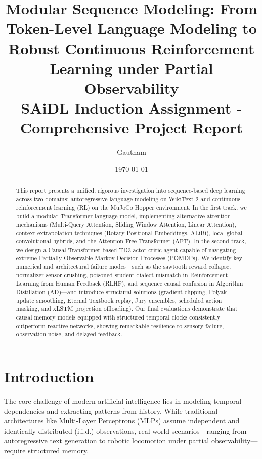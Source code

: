 \documentclass[11pt,a4paper]{article}
\title{\textbf{Modular Sequence Modeling: From Token-Level Language Modeling to Robust Continuous Reinforcement Learning under Partial Observability} \\ \large SAiDL Induction Assignment - Comprehensive Project Report}
\author{Gautham}
\date{\today}
\begin{document}
\maketitle

\begin{abstract}
This report presents a unified, rigorous investigation into sequence-based deep learning across two domains: autoregressive language modeling on WikiText-2 and continuous reinforcement learning (RL) on the MuJoCo Hopper environment. In the first track, we build a modular Transformer language model, implementing alternative attention mechanisms (Multi-Query Attention, Sliding Window Attention, Linear Attention), context extrapolation techniques (Rotary Positional Embeddings, ALiBi), local-global convolutional hybrids, and the Attention-Free Transformer (AFT). In the second track, we design a Causal Transformer-based TD3 actor-critic agent capable of navigating extreme Partially Observable Markov Decision Processes (POMDPs). We identify key numerical and architectural failure modes—such as the sawtooth reward collapse, normalizer sensor crushing, poisoned student dialect mismatch in Reinforcement Learning from Human Feedback (RLHF), and sequence causal confusion in Algorithm Distillation (AD)—and introduce structural solutions (gradient clipping, Polyak update smoothing, Eternal Textbook replay, Jury ensembles, scheduled action masking, and xLSTM projection offloading). Our final evaluations demonstrate that causal memory models equipped with structured temporal clocks consistently outperform reactive networks, showing remarkable resilience to sensory failure, observation noise, and delayed feedback.
\end{abstract}

\newpage
\tableofcontents
\newpage

\section{Introduction}
The core challenge of modern artificial intelligence lies in modeling temporal dependencies and extracting patterns from history. While traditional architectures like Multi-Layer Perceptrons (MLPs) assume independent and identically distributed (i.i.d.) observations, real-world scenarios—ranging from autoregressive text generation to robotic locomotion under partial observability—require structured memory. 
\end{document}
